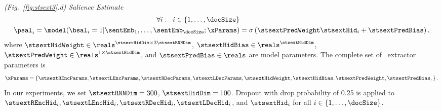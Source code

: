 ~\\

\vspace{10pt} \noindent \textit{(Fig.~\ref{fig:stsext3}.d) Salience Estimate}
\begin{align}
    \forall i : \;\; i \in \{1,\ldots,\docSize\} & \nonumber\\
\psal_i =    \model(\bsal_i=1|\sentEmb_1, \ldots,\sentEmb_\docSize;\xParams)& = 
            \sigma\left(\stsextPredWeight \stsextHid_i + \stsextPredBias  
            \right).
\end{align}
where $\stsextHidWeight \in \reals^{\stsextHidDim \times 3\stsextRNNDim}$,
$\stsextHidBias \in \reals^{\stsextHidDim}$, 
$\stsextPredWeight \in \reals^{1 \times \stsextHidDim}$, and
$\stsextPredBias \in \reals$ are model parameters.
The complete set of \stsext~extractor parameters is 
\[\xParams = \left\{ \stsextREncParams, \stsextLEncParams,
        \stsextRDecParams, \stsextLDecParams, \stsextHidWeight, \stsextHidBias, \stsextPredWeight, \stsextPredBias, \right\}. \]
        In our experiments, we set $\stsextRNNDim=300$, $\stsextHidDim=100$.
        Dropout with drop probability of 0.25 is applied to $\stsextREncHid_i,
        \stsextLEncHid_i, \stsextRDecHid_i, \stsextLDecHid_i$, and $\stsextHid_i$ for all $i \in \{1,\ldots,\docSize\}$.

